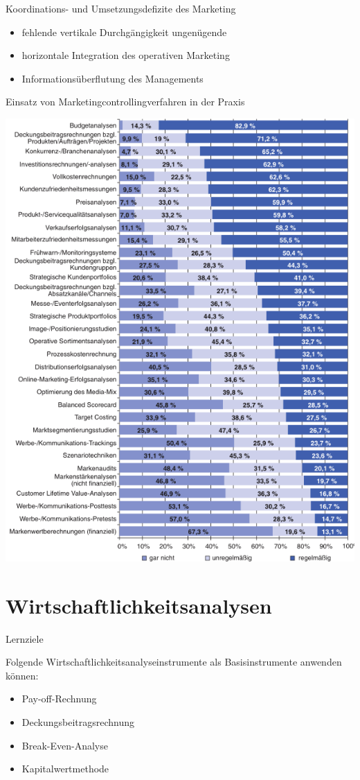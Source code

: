 \documentclass[12pt,ngerman,a4paper,ignorenonframetext,]{beamer}
\providecommand{\tightlist}{%
  \setlength{\itemsep}{0pt}\setlength{\parskip}{0pt}}
\begin{document}
\begin{frame}{Koordinations- und Umsetzungsdefizite des Marketing}
\protect\hypertarget{koordinations--und-umsetzungsdefizite-des-marketing}{}

\begin{itemize}
\tightlist
\item
  fehlende vertikale Durchgängigkeit ungenügende
\item
  horizontale Integration des operativen Marketing
\item
  Informationsüberflutung des Managements
\end{itemize}

\end{frame}

\begin{frame}{Einsatz von Marketingcontrollingverfahren in der Praxis}
\protect\hypertarget{einsatz-von-marketingcontrollingverfahren-in-der-praxis}{}

\begin{center}\includegraphics[width=0.48\linewidth]{./images/Marketingcontrolling/Einsatz} \end{center}

\end{frame}

\hypertarget{wirtschaftlichkeitsanalysen}{%
\section{Wirtschaftlichkeitsanalysen}\label{wirtschaftlichkeitsanalysen}}

\begin{frame}{Lernziele}
\protect\hypertarget{lernziele-1}{}

Folgende Wirtschaftlichkeitsanalyseinstrumente als Basisinstrumente
anwenden können:

\begin{itemize}
\tightlist
\item
  Pay-off-Rechnung
\item
  Deckungsbeitragsrechnung
\item
  Break-Even-Analyse
\item
  Kapitalwertmethode
\end{itemize}

\end{frame}
\end{document}
